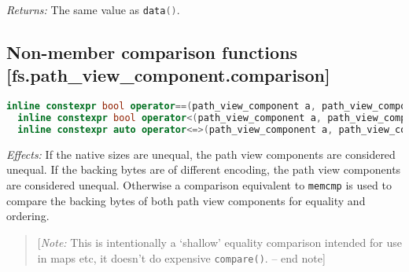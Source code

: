\documentclass[11pt]{article}
\newcommand{\code}[2][cpp]{\lstinline[language=#1,basicstyle=\small\ttfamily]{#2}}
\newcommand{\desc}[1]{\textit{#1}}
\newcommand{\effects}{\desc{Effects: }}
\newcommand{\returns}{\desc{Returns: }}
\newcommand{\note}[1]{\begin{quote}[\textit{Note:} #1 -- end note]\end{quote}}
\begin{document}
\returns The same value as \code{data()}.\\

\subsection*{Non-member comparison functions [fs.path\_view\_component.comparison]}

\begin{lstlisting}[language=cpp]
  inline constexpr bool operator==(path_view_component a, path_view_component b) noexcept;
  inline constexpr bool operator<(path_view_component a, path_view_component b) noexcept;
  inline constexpr auto operator<=>(path_view_component a, path_view_component b) = default;
\end{lstlisting}

\effects If the native sizes are unequal, the path view components are considered unequal. If the backing bytes are of different encoding, the path view components are considered unequal. Otherwise a comparison equivalent to \code{memcmp} is used to compare the backing bytes of both path view components for equality and ordering.
\color{black}

\note{This is intentionally a `shallow' equality comparison intended for use in maps etc, it doesn't do expensive \code{compare()}.}

\color{darkgreen}
\end{document}
